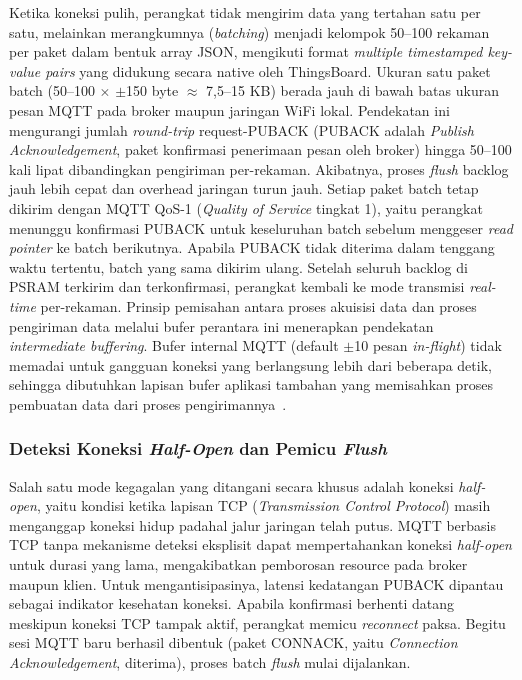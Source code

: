 Ketika koneksi pulih, perangkat tidak mengirim data yang tertahan satu per satu,
melainkan merangkumnya (\textit{batching}) menjadi kelompok 50--100 rekaman per paket
dalam bentuk array JSON, mengikuti format \textit{multiple timestamped key-value pairs}
yang didukung secara native oleh ThingsBoard. Ukuran satu paket batch (50--100 $\times$
$\pm$150 byte $\approx$ 7,5--15 KB) berada jauh di bawah batas ukuran pesan MQTT pada
broker maupun jaringan WiFi lokal. Pendekatan ini mengurangi jumlah \textit{round-trip}
request-PUBACK (PUBACK adalah \textit{Publish Acknowledgement}, paket konfirmasi
penerimaan pesan oleh broker) hingga 50--100 kali lipat dibandingkan pengiriman per-rekaman.
Akibatnya, proses \textit{flush} backlog jauh lebih cepat dan overhead jaringan turun
jauh. Setiap paket batch tetap dikirim dengan MQTT QoS-1 (\textit{Quality of Service} tingkat 1), yaitu perangkat menunggu
konfirmasi PUBACK untuk keseluruhan batch sebelum menggeser \textit{read pointer} ke
batch berikutnya. Apabila PUBACK tidak diterima dalam tenggang waktu tertentu, batch
yang sama dikirim ulang. Setelah seluruh backlog di PSRAM terkirim dan terkonfirmasi,
perangkat kembali ke mode transmisi \textit{real-time} per-rekaman. Prinsip pemisahan
antara proses akuisisi data dan proses pengiriman data melalui bufer perantara ini
menerapkan pendekatan \textit{intermediate buffering}. Bufer internal MQTT
(default $\pm$10 pesan \textit{in-flight}) tidak memadai untuk gangguan koneksi yang
berlangsung lebih dari beberapa detik, sehingga dibutuhkan lapisan bufer aplikasi
tambahan yang memisahkan proses pembuatan data dari proses pengirimannya~\cite{tipparaju_2021}.

\subsubsection{Deteksi Koneksi \textit{Half-Open} dan Pemicu \textit{Flush}}

Salah satu mode kegagalan yang ditangani secara khusus adalah koneksi \textit{half-open},
yaitu kondisi ketika lapisan TCP (\textit{Transmission Control Protocol}) masih menganggap koneksi hidup padahal jalur jaringan
telah putus. MQTT berbasis TCP tanpa mekanisme deteksi eksplisit dapat mempertahankan
koneksi \textit{half-open} untuk durasi yang lama, mengakibatkan pemborosan resource pada
broker maupun klien. Untuk mengantisipasinya, latensi kedatangan PUBACK dipantau sebagai
indikator kesehatan koneksi. Apabila konfirmasi berhenti datang meskipun koneksi TCP
tampak aktif, perangkat memicu \textit{reconnect} paksa. Begitu sesi MQTT baru berhasil
dibentuk (paket CONNACK, yaitu \textit{Connection Acknowledgement}, diterima), proses batch \textit{flush} mulai
dijalankan.

